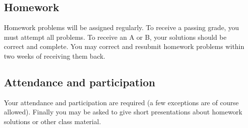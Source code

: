 \documentclass[12pt,oneside]{amsart}
\begin{document}
\subsection*{Homework}
Homework problems will be assigned regularly. To receive a passing grade, you must attempt all problems. To receive an A or B, your solutions should be correct and complete. You may correct and resubmit homework problems within two weeks of receiving them back.

\subsection*{Attendance and participation}
Your attendance and participation are required (a few exceptions are of course allowed). Finally you may be asked to give short presentations about homework solutions or other class material.
\end{document}
